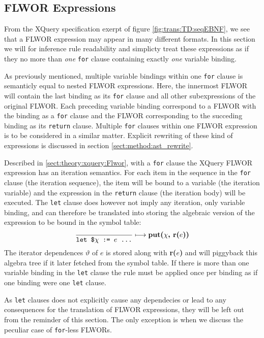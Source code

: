 \subsection{FLWOR Expressions}
\label{sect:trans:TD:simpleFLWOR}
From the XQuery specification exerpt of figure \ref{fig:trans:TD:seqEBNF}, we see that a FLWOR expression may
appear in many different formats. In this section we will for inference rule readability and simplicty treat these
expressions as if they no more than \emph{one} \texttt{for} clause containing exactly \emph{one} variable binding.

As previously mentioned, multiple variable bindings within one \texttt{for} clause is semanticly equal to
nested FLWOR expressions. Here, the innermost FLWOR will contain the last binding as its \texttt{for} clause and
all other subexpressions of the original FLWOR. Each preceding variable binding correspond to a FLWOR with the
binding as a \texttt{for} clause and the FLWOR corresponding to the succeding binding as its \texttt{return}
clause. Multiple \texttt{for} clauses within one FLWOR expression is to be considered in a similar matter.
Explicit rewriting of these kind of expressions is discussed in section \ref{sect:method:ast_rewrite}.

Described in \ref{sect:theory:xquery:Flwor}, with a \texttt{for} clause the XQuery FLWOR expression has an
iteration semantics. For each item in the sequence in the \texttt{for} clause (the iteration sequence), the item
will be bound to a variable (the iteration variable) and the expression in the \texttt{return} clause (the
iteration body) will be executed. The \texttt{let} clause does however not imply any iteration, only variable
binding, and can therefore be translated into storing the algebraic version of the expression to be bound in the
symbol table:
\begin{equation}
\frac{}{\mbox{\texttt{let \$}}\chi \mbox{\texttt{ := }}e \mbox{\texttt{ \ldots}}}\longmapsto
\mbox{\textbf{put(}}\chi\mbox{\textbf{, r(}}e\mbox{\textbf{))}}
\label{rule:trans:TD:let}
\end{equation}
The iterator dependences $\vartheta$ of $e$ is stored along with \textbf{r(}$e$\textbf{)} and will piggyback this
algebra tree if it later fetched from the symbol table. If there is more than one variable binding in the
\texttt{let} clause the rule must be applied once per binding as if one binding were one \texttt{let} clause.




As \texttt{let} clauses does not explicitly cause any dependecies or lead to any consequences for the translation
of FLWOR expressions, they will be left out from the reminder of this section. The only exception is when we
discuss the peculiar case of \texttt{for}-less FLWORs. 



